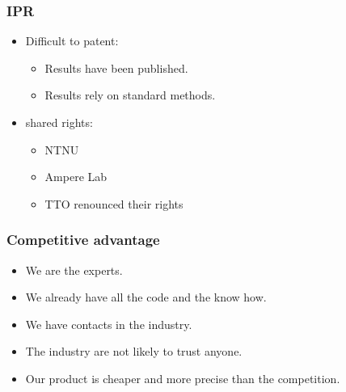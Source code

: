 \begin{frame}
		\frametitle{IPR}
		\begin{itemize}
			\item Difficult to patent:
				\begin{itemize}
					\item Results have been published.
					\item Results rely on standard methods.
				\end{itemize}
			\item shared rights:
				\begin{itemize}
						\item NTNU
						\item Ampere Lab
						\item TTO renounced their rights
				\end{itemize}
\end{itemize}
\end{frame}
\begin{frame}
		\frametitle{Competitive advantage}
		\begin{itemize}
			\item We are the experts.
			\item We already have all the code and the know how.
			\item We have contacts in the industry.
			\item The industry are not likely to trust anyone.
			\item Our product is cheaper and more precise than the competition.
	\end{itemize}
	\end{frame}
